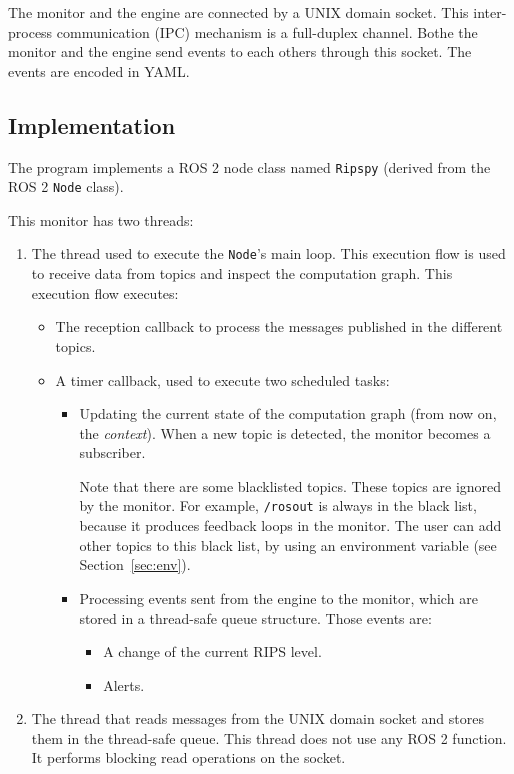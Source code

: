 \documentclass[a4paper]{article}
\begin{document}
The monitor and the engine are connected by a UNIX domain socket. This
inter-process communication (IPC) mechanism is a full-duplex channel.
Bothe the monitor and the engine send events to each others through this socket. The events are
encoded in YAML.

\subsection{Implementation}

The program implements a ROS 2 node class
named \texttt{Ripspy} (derived from the ROS 2 \texttt{Node}
class).

This monitor has two threads:

\begin{enumerate}
	\item The thread used to execute the \texttt{Node}'s main loop.
	This execution flow is used to receive data
	from topics and inspect the computation graph.
	This execution flow executes:

	\begin{itemize}
		\item The reception callback to process the messages
		published in the different topics.

		\item A timer callback, used to execute two
		scheduled tasks:

		\begin{itemize}
			\item Updating the current state of the computation
			graph (from now on, the \textit{context}).
			When a new topic is detected, the monitor
			becomes a subscriber.

			Note that there are some blacklisted topics.
			These topics are ignored by the monitor. For example,
			\texttt{/rosout} is always in the black list,
			because it produces feedback loops in the monitor.
			The user can add other
			topics to this black list, by using an environment
			variable (see Section~\ref{sec:env}).

			\item Processing events sent from the engine to
			the monitor, which
			are stored in a thread-safe queue structure.
			Those events are:

			\begin{itemize}
				\item A change of the current RIPS level.

				\item Alerts.
			\end{itemize}
		\end{itemize}
	\end{itemize}

	\item The thread that reads messages from the UNIX domain socket
	and stores them in the thread-safe queue. This thread does not
	use any ROS 2 function. It performs blocking read operations
	on the socket.
\end{enumerate}
\end{document}
